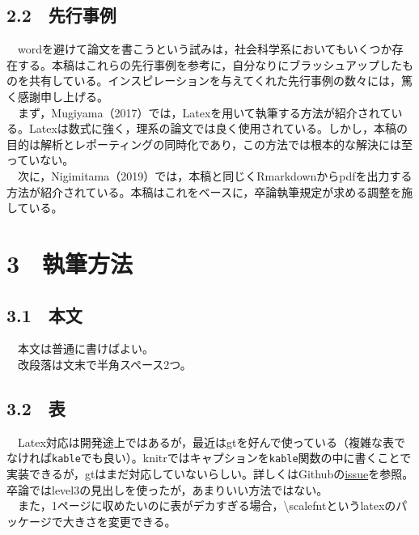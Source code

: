 \documentclass[
  a4paper]{ltjsarticle}
\begin{document}
\hypertarget{ux5148ux884cux4e8bux4f8b}{%
\subsection{2.2　先行事例}\label{ux5148ux884cux4e8bux4f8b}}

　wordを避けて論文を書こうという試みは，社会科学系においてもいくつか存在する。本稿はこれらの先行事例を参考に，自分なりにブラッシュアップしたものを共有している。インスピレーションを与えてくれた先行事例の数々には，篤く感謝申し上げる。\\
　まず，Mugiyama（2017）では，Latexを用いて執筆する方法が紹介されている。Latexは数式に強く，理系の論文では良く使用されている。しかし，本稿の目的は解析とレポーティングの同時化であり，この方法では根本的な解決には至っていない。\\
　次に，Nigimitama（2019）では，本稿と同じくRmarkdownからpdfを出力する方法が紹介されている。本稿はこれをベースに，卒論執筆規定が求める調整を施している。

\theendnotes

\clearpage

\hypertarget{ux57f7ux7b46ux65b9ux6cd5}{%
\section{3　執筆方法}\label{ux57f7ux7b46ux65b9ux6cd5}}

\hypertarget{ux672cux6587}{%
\subsection{3.1　本文}\label{ux672cux6587}}

　本文は普通に書けばよい。\\
　改段落は文末で半角スペース2つ。

\hypertarget{ux8868}{%
\subsection{3.2　表}\label{ux8868}}

　Latex対応は開発途上ではあるが，最近はgtを好んで使っている（複雑な表でなければ\texttt{kable}でも良い）。knitrではキャプションを\texttt{kable}関数の中に書くことで実装できるが，gtはまだ対応していないらしい。詳しくはGithubの\href{https://github.com/rstudio/gt/issues/635}{issue}を参照。卒論ではlevel3の見出しを使ったが，あまりいい方法ではない。\\
　また，1ページに収めたいのに表がデカすぎる場合，\textbackslash scalefntというlatexのパッケージで大きさを変更できる。
\end{document}
